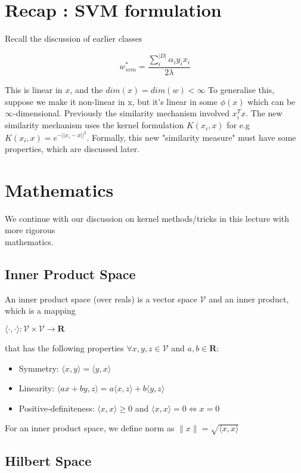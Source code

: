 \documentclass[12pt]{article}
\begin{document}
    \MakeScribeTop

\section{Recap : SVM formulation}
Recall the discussion of earlier classes 
\begin{center}
   \[w^{*}_{svm} = \frac{\sum_{i}^{|D|} \alpha_{i} y_{i} x_{i} }{2\lambda} \]
\end{center}

This is linear in $x$, and the $dim(x) = dim(w) < \infty$
To generalise this, suppose we make it non-linear in x, but it's linear in some $\phi(x)$ which can be $\infty$-dimensional.   
Previously the similarity mechanism involved $x_{i}^{T}x$. The new similarity mechanism uses the kernel 
formulation $K(x_{i},x)$ for e.g $K(x_i,x) = e^{-||x_i-x||^{2}}$.
Formally, this new "similarity measure" must have some properties, which are discussed later.




\section{Mathematics}
We continue with our discussion on kernel methods/tricks in this lecture with more rigorous \\mathematics.
\subsection{Inner Product Space}
An inner product space (over reals) is a vector space $\mathcal{V}$ and an inner product, which is a
mapping
\begin{center}
    $\langle\cdot,\cdot\rangle:\mathcal{V}\times\mathcal{V}\to\mathcal{\boldsymbol{R}}$
\end{center}
that has the following properties $\forall x,y,z\in \mathcal{V}$ and $a,b \in \mathcal{\boldsymbol{R}}$:
\begin{itemize}
    \item Symmetry: $\langle x,y\rangle = \langle y,x \rangle$
    \item Linearity: $\langle ax+by,z \rangle = a\langle x,z\rangle + b\langle y,z \rangle $
    \item Positive-definiteness: $\langle x,x \rangle\geq 0$ and $\langle x,x \rangle=0 \iff x=0$
\end{itemize}
For an inner product space, we define norm as $\|x\|=\sqrt{\langle x,x \rangle}$
\subsection{Hilbert Space}
\end{document}
